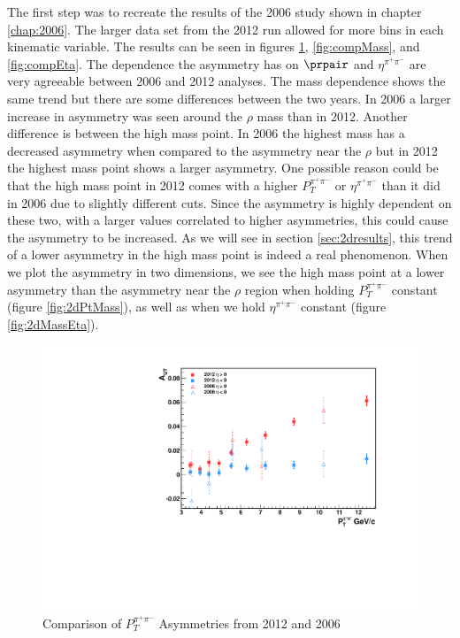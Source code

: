 \documentclass[abstract = on,listof=totoc, bibliography=totoc]{scrreprt}
\newcommand{\ptpair}{P_{T}^{\pi^+\pi^-}}
\newcommand{\etapair}{\eta^{\pi^+\pi^-}}
\begin{document}
The first step was to recreate the results of the 2006 study shown in chapter \ref{chap:2006}. The larger data set from the 2012 run allowed for more bins in each kinematic variable. The results can be seen in figures  \ref{fig:compPt}, \ref{fig:compMass}, and \ref{fig:compEta}. The dependence the asymmetry has on $\prpair$ and $\etapair$ are very agreeable between 2006 and 2012 analyses. The mass dependence shows the same trend but there are some differences between the two years. In 2006 a larger increase in asymmetry was seen around the $\rho$ mass than in 2012. Another difference is between the high mass point. In 2006 the highest mass has a decreased asymmetry when compared to the asymmetry near the $\rho$ but in 2012 the highest mass point shows a larger asymmetry. One possible reason could be that the high mass point in 2012 comes with a higher $\ptpair$ or $\etapair$ than it did in 2006 due to slightly different cuts. Since the asymmetry is highly dependent on these two, with a larger values correlated to higher asymmetries, this could cause the asymmetry to be increased. As we will see in section \ref{sec:2dresults}, this trend of a lower asymmetry in the high mass point is indeed a real phenomenon. When we plot the asymmetry in two dimensions, we see the high mass point at a lower asymmetry than the asymmetry near the $\rho$ region when holding $\ptpair$ constant (figure \ref{fig:2dPtMass}), as well as when we hold $\etapair$ constant (figure \ref{fig:2dMassEta}).    


\begin{figure}
\begin{center}
\includegraphics[width = .7\textwidth]{asymsHiLoAnselm_Pt_8_24_15}
\caption[$\ptpair$ Asymmetries 2012 and 2006]{Comparison of $\ptpair$ Asymmetries from 2012 and 2006}
\label{fig:compPt}
\end{center}
\end{figure}
\end{document}
